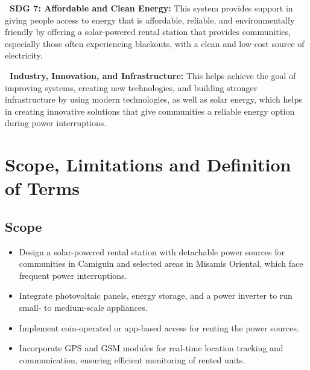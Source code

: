 {\vspace{0.6em} 
\addtocounter{subsection}{1}
\noindent\textbf{\thesubsection\ SDG 7: Affordable and Clean Energy:} 
This system provides support in giving people access to energy that is affordable, reliable, and environmentally friendly by offering a solar-powered rental station that provides communities, especially those often experiencing blackouts, with a clean and low-cost source of electricity.

\vspace{0.6em} 
\addtocounter{subsection}{1}
\noindent\textbf{\thesubsection\ Industry, Innovation, and Infrastructure:} 
 This helps achieve the goal of improving systems, creating new technologies, and building stronger infrastructure by using modern technologies, as well as solar energy, which helps in creating innovative solutions that give communities a reliable energy option during power interruptions.


\section{Scope, Limitations and Definition of Terms}

\subsection{Scope}
	\begin{itemize}
		\item Design a solar-powered rental station with detachable power sources for communities in Camiguin and selected areas in Misamis Oriental, which face frequent power interruptions.
		\item Integrate photovoltaic panels, energy storage, and a power inverter to run small- to medium-scale appliances.
		\item Implement coin-operated or app-based access for renting the power sources.
		\item Incorporate GPS and GSM modules for real-time location tracking and communication, ensuring efficient monitoring of rented units.
\end{itemize}

}

